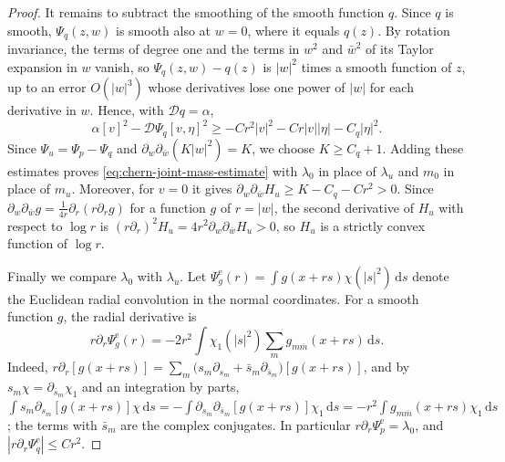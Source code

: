 \begin{proof}
It remains to subtract the smoothing of the smooth function $q$. Since $q$ is smooth, $\Psi_q(z,w)$ is smooth also at $w=0$, where it equals $q(z)$. By rotation invariance, the terms of degree one and the terms in $w^2$ and $\bar w^2$ of its Taylor expansion in $w$ vanish, so $\Psi_q(z,w)-q(z)$ is $|w|^2$ times a smooth function of $z$, up to an error $O(|w|^3)$ whose derivatives lose one power of $|w|$ for each derivative in $w$. Hence, with $\mathcal Dq=\alpha$,
\[
 \alpha[v]^2-\mathcal D\Psi_q[v,\eta]^2\geq-Cr^2|v|^2-Cr|v||\eta|-C_q|\eta|^2.
\]
Since $\Psi_u=\Psi_p-\Psi_q$ and $\partial_w\partial_{\bar w}(K|w|^2)=K$, we choose $K\geq C_q+1$. Adding these estimates proves \eqref{eq:chern-joint-mass-estimate} with $\lambda_0$ in place of $\lambda_u$ and $m_0$ in place of $m_u$. Moreover, for $v=0$ it gives $\partial_w\partial_{\bar w}H_u\geq K-C_q-Cr^2>0$. Since $\partial_w\partial_{\bar w}g=\frac1{4r}\partial_r(r\partial_rg)$ for a function $g$ of $r=|w|$, the second derivative of $H_u$ with respect to $\log r$ is $(r\partial_r)^2H_u=4r^2\partial_w\partial_{\bar w}H_u>0$, so $H_u$ is a strictly convex function of $\log r$.

Finally we compare $\lambda_0$ with $\lambda_u$. Let $\Psi^{\mathrm e}_g(r)=\int g(x+rs)\chi(|s|^2)\,\mathrm ds$ denote the Euclidean radial convolution in the normal coordinates. For a smooth function $g$, the radial derivative is
\begin{equation}\label{eq:chern-radial-derivative}
 r\partial_r\Psi^{\mathrm e}_g(r)=-2r^2\int\chi_1(|s|^2)\sum_mg_{m\bar m}(x+rs)\,\mathrm ds.
\end{equation}
Indeed, $r\partial_r[g(x+rs)]=\sum_m\bigl(s_m\partial_{s_m}+\bar s_m\partial_{\bar s_m}\bigr)[g(x+rs)]$, and by $s_m\chi=\partial_{\bar s_m}\chi_1$ and an integration by parts, $\int s_m\partial_{s_m}[g(x+rs)]\chi\,\mathrm ds=-\int\partial_{s_m}\partial_{\bar s_m}[g(x+rs)]\chi_1\,\mathrm ds=-r^2\int g_{m\bar m}(x+rs)\chi_1\,\mathrm ds$; the terms with $\bar s_m$ are the complex conjugates. In particular $r\partial_r\Psi^{\mathrm e}_p=\lambda_0$, and $|r\partial_r\Psi^{\mathrm e}_q|\leq Cr^2$.


\end{proof}
